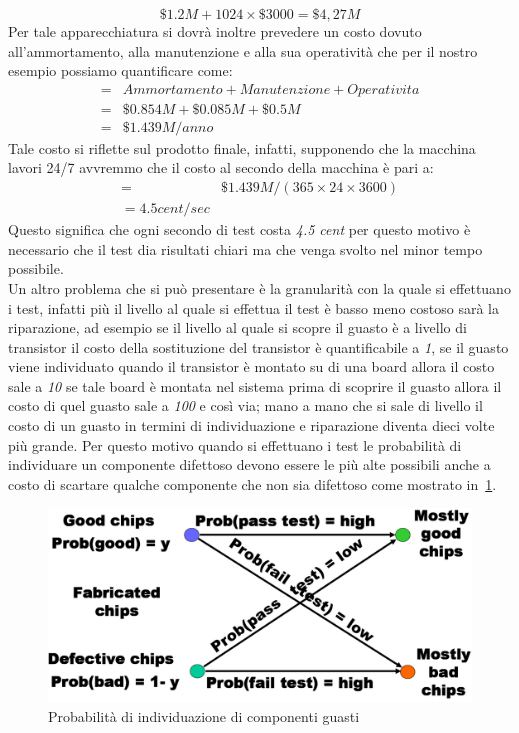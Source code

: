 $$\$1.2M + 1024 \times\$3000 = \$4,27M$$
Per tale apparecchiatura si dovrà inoltre prevedere un costo dovuto all'ammortamento, alla manutenzione e alla sua operatività che per il nostro esempio possiamo quantificare come:
$$
\begin{array}{cl}
= & Ammortamento + Manutenzione + Operativita \\
= & \$ 0.854M + \$ 0.085M + \$ 0.5M \\
= & \$ 1.439M/anno
\end{array}
$$
Tale costo si riflette sul prodotto finale, infatti, supponendo che la macchina lavori 24/7 avvremmo che il costo al secondo della macchina è pari a:
$$
\begin{array}{cl}
= & \$ 1.439M/(365 \times 24 \times 3600)\\
= 4.5 cent/sec
\end{array}
$$
Questo significa che ogni secondo di test costa \emph{4.5 cent} per questo motivo è necessario che il test dia risultati chiari ma che venga svolto nel minor tempo possibile.\\
Un altro problema che si può presentare è la granularità con la quale si effettuano i test, infatti più il livello al quale si effettua il test è basso meno costoso sarà la riparazione, ad esempio se il livello al quale si scopre il guasto è a livello di transistor il costo della sostituzione del transistor è quantificabile a \emph{1}, se il guasto viene individuato quando il transistor è montato su di una board allora il costo sale a \emph{10} se tale board è montata nel sistema prima di scoprire il guasto allora il costo di quel guasto sale a \emph{100} e così via; mano a mano che si sale di livello il costo di un guasto in termini di individuazione e riparazione diventa dieci volte più grande. Per questo motivo quando si effettuano i test le probabilità di individuare un componente difettoso devono essere le più alte possibili anche a costo di scartare qualche componente che non sia difettoso come mostrato in \figurename\,\ref{fig:probguasto}.\\
\begin{figure}
\centering
\includegraphics[scale=0.35]{img/probguasto.png}
\caption{Probabilità di individuazione di componenti guasti}\label{fig:probguasto}
\end{figure}
